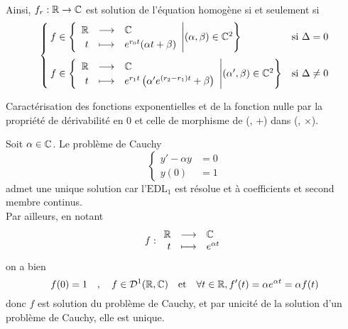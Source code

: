 \documentclass{article}
\begin{document}
\begin{question_kholle}
\begin{align*}
	\end{align*}
	Ainsi, $f_{r}:\mathbb R\rightarrow\mathbb C$ est solution de l'équation homogène si et seulement si
	\[
		\begin{cases}
			f\in \left\{\begin{array}{rcl} \mathbb R & \longrightarrow & \mathbb C \\ t & \longmapsto & e^{r_{0}t}(\alpha t+\beta) \end{array} \middle| (\alpha, \beta)\in\mathbb C^{2}\right\}                                 & \text{si $\Delta=0$}     \\[15pt]
			f\in \left\{\begin{array}{rcl} \mathbb R & \longrightarrow & \mathbb C \\ t & \longmapsto & e^{r_{1}t}\left(\alpha ' e^{(r_{2}-r_{1})t}+\beta\right) \end{array} \middle| (\alpha ', \beta)\in\mathbb C^{2}\right\} & \text{si $\Delta\neq 0$}
		\end{cases}
	\]
\end{question_kholle}

\begin{question_kholle}[{
				\begin{propositions}
					\item \textit{Comme solution d’un problème de Cauchy.} Soit $\alpha\in\C$.
					\[
						\applic{\R}{\C}{t}{e^{\alpha t}} \text{ est l’unique solution de } \begin{cases}
							y'-\alpha y & =0 \\
							y(0)        & =1
						\end{cases}
					\]
					\item \textit{Par la propriété de morphisme et de non-annulation.}
					\begin{multline}
						\left\{f:\R\longrightarrow\C \middle| f \text{ dérivable en 0 et } \forall (s,u)\in\R^{2}, f(s+u)=f(s)f(u)\right\} \\=\{\widetilde{0}\}\cup \left\{\applic{\R}{\C}{t}{e^{\alpha t}}\middle| \alpha\in\C\right\}
					\end{multline}
				\end{propositions}
			}]{Caractérisation des fonctions exponentielles et de la fonction nulle par la propriété de dérivabilité en 0 et celle de morphisme de (\R, +) dans (\C, $\times$).}
	\begin{propositions}
		\item Soit $\alpha\in\C$. Le problème de Cauchy
		\[
			\begin{cases}
				y'-\alpha y & =0 \\
				y(0)        & =1
			\end{cases}
		\]
		admet une unique solution car l’$\mathrm{EDL_{1}}$ est résolue et à coefficients et second membre continus.\\
		Par ailleurs, en notant
		\[
			f:\begin{array}{rcl} \mathbb R & \longrightarrow & \mathbb C \\ t & \longmapsto & e^{\alpha t} \end{array}
		\]
		on a bien
		\[
			f(0)=1 \quad , \quad f\in\mathcal{D}^{1}(\mathbb R,\mathbb C) \quad\text{et}\quad \forall t\in\mathbb R, f'(t)=\alpha e^{\alpha t}=\alpha f(t)
		\]
		donc $f$ est solution du problème de Cauchy, et par unicité de la solution d’un problème de Cauchy, elle est unique.


\end{propositions}
\end{question_kholle}
\end{document}
